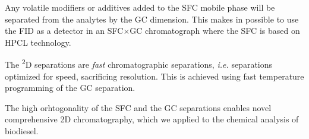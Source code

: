 Any volatile modifiers or additives added to the SFC mobile phase will be separated from
the analytes by the GC dimension. This makes in possible to use the FID as a detector
in an SFC$\times$GC chromatograph where the SFC is based on HPCL technology.

The \textsuperscript{2}D separations are \textit{fast} chromatographic
separations, \textit{i.e.} separations optimized for speed, sacrificing
resolution. This is achieved using fast temperature programming of the GC
separation.

The high orhtogonality of the SFC and the GC separations enables novel comprehensive 2D
chromatography, which we applied to the chemical analysis of biodiesel.
